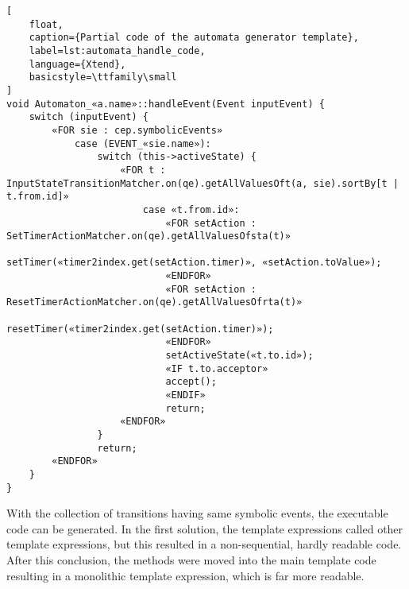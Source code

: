 \begin{lstlisting}[
	float,
	caption={Partial code of the automata generator template},
	label=lst:automata_handle_code,
	language={Xtend},
	basicstyle=\ttfamily\small
]
void Automaton_«a.name»::handleEvent(Event inputEvent) {
	switch (inputEvent) {
		«FOR sie : cep.symbolicEvents»
			case (EVENT_«sie.name»):
				switch (this->activeState) {
					«FOR t : InputStateTransitionMatcher.on(qe).getAllValuesOft(a, sie).sortBy[t | t.from.id]»
						case «t.from.id»:
							«FOR setAction : SetTimerActionMatcher.on(qe).getAllValuesOfsta(t)»
								setTimer(«timer2index.get(setAction.timer)», «setAction.toValue»);
							«ENDFOR»
							«FOR setAction : ResetTimerActionMatcher.on(qe).getAllValuesOfrta(t)»
								resetTimer(«timer2index.get(setAction.timer)»);
							«ENDFOR»
							setActiveState(«t.to.id»);
							«IF t.to.acceptor»
							accept();
							«ENDIF»
							return;
					«ENDFOR»
				}
				return;
		«ENDFOR»
	}
}
\end{lstlisting}

With the collection of transitions having same symbolic events, the executable \cpp{} code can be generated. In the first solution, the template expressions called other template expressions, but this resulted in a non-sequential, hardly readable code. After this conclusion, the methods were moved into the main template code resulting in a monolithic template expression, which is far more readable.
